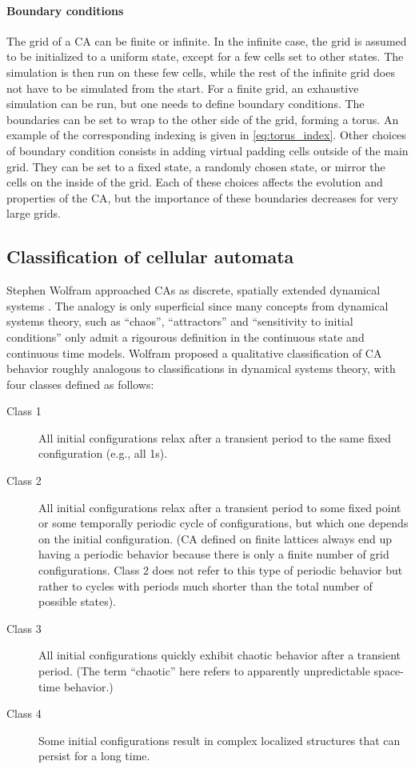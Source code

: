 \paragraph{Boundary conditions}
The grid of a \ac{CA} can be finite or infinite. In the infinite case, the grid
is assumed to be initialized to a uniform state, except for a few cells set to
other states. The simulation is then run on these few cells, while the rest of
the infinite grid does not have to be simulated from the start. For a finite
grid, an exhaustive simulation can be run, but one needs to define
boundary conditions. The boundaries can be set to wrap to the other side of the
grid, forming a torus. An example of the corresponding indexing is given in
\eqref{eq:torus_index}. Other choices of boundary condition consists in adding
virtual padding cells outside of the main grid. They can be set to a fixed
state, a randomly chosen state, or mirror the cells on the inside of the grid.
Each of these choices affects the evolution and properties of the \ac{CA}, but
the importance of these boundaries decreases for very large grids.

\subsection{Classification of cellular automata\label{sec:class-cell-autom}}

Stephen Wolfram approached \acp{CA} as discrete, spatially extended dynamical
systems \parencite{wolframUniversalityComplexityCellular1984}. The analogy is
only superficial since many concepts from dynamical systems theory, such as
``chaos'', ``attractors'' and ``sensitivity to initial conditions'' only admit a
rigourous definition in the continuous state and continuous time models. Wolfram
proposed a qualitative classification of CA behavior roughly analogous to
classifications in dynamical systems theory, with four classes defined as
follows:

\begin{description}
  \item[Class 1] All initial configurations relax after a transient
        period to the same fixed configuration (e.g., all 1s).
  \item[Class 2] All initial configurations relax after a transient period to some
        fixed point or some temporally periodic cycle of configurations, but
        which one depends on the initial configuration. (\ac{CA} defined on
        finite lattices always end up having a periodic behavior because there
        is only a finite number of grid configurations. Class 2 does not refer to
        this type of periodic behavior but rather to cycles with periods much
        shorter than the total number of possible states).
  \item[Class 3] All initial configurations quickly exhibit chaotic behavior
        after a transient period. (The term “chaotic” here refers to
        apparently unpredictable space-time behavior.)
  \item[Class 4] Some initial configurations result in complex localized
        structures that can persist for a long time.
\end{description}

